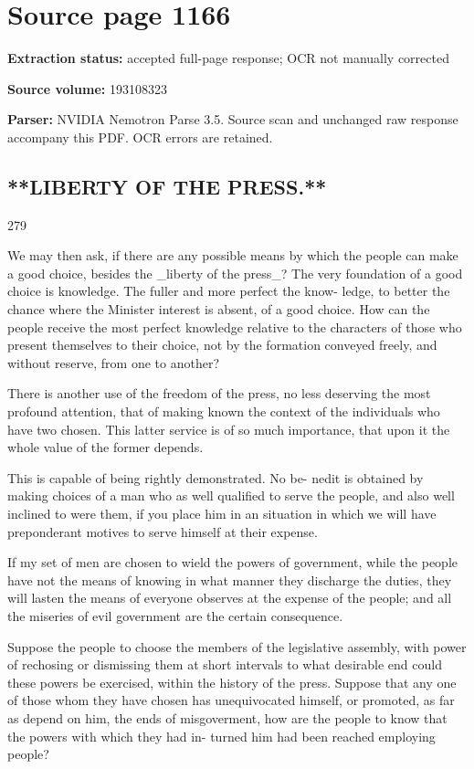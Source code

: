 \clearpage
\section{Source page 1166}
\textbf{Extraction status:} accepted full-page response; OCR not manually corrected\par
\textbf{Source volume:} 193108323\par
\textbf{Parser:} NVIDIA Nemotron Parse 3.5. Source scan and unchanged raw response accompany this PDF. OCR errors are retained.\par\medskip
\subsection*{**LIBERTY OF THE PRESS.**}
279\par\medskip
We may then ask, if there are any possible means by which the people can make a good choice, besides the \_liberty of the press\_? The very foundation of a good choice is knowledge. The fuller and more perfect the know- ledge, to better the chance where the Minister interest is absent, of a good choice. How can the people receive the most perfect knowledge relative to the characters of those who present themselves to their choice, not by the formation conveyed freely, and without reserve, from one to another?\par\medskip
There is another use of the freedom of the press, no less deserving the most profound attention, that of making known the context of the individuals who have two chosen. This latter service is of so much importance, that upon it the whole value of the former depends.\par\medskip
This is capable of being rightly demonstrated. No be- nedit is obtained by making choices of a man who as well qualified to serve the people, and also well inclined to were them, if you place him in an situation in which we will have preponderant motives to serve himself at their expense.\par\medskip
If my set of men are chosen to wield the powers of government, while the people have not the means of knowing in what manner they discharge the duties, they will lasten the means of everyone observes at the expense of the people; and all the miseries of evil government are the certain consequence.\par\medskip
Suppose the people to choose the members of the legislative assembly, with power of rechosing or dismissing them at short intervals to what desirable end could these powers be exercised, within the history of the press. Suppose that any one of those whom they have chosen has unequivocated himself, or promoted, as far as depend on him, the ends of misgoverment, how are the people to know that the powers with which they had in- turned him had been reached employing people?\par\medskip
